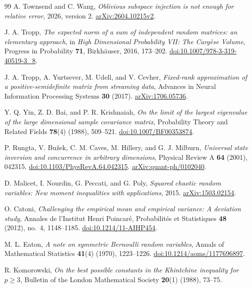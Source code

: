 \documentclass[11pt,a4paper]{article}
\theoremstyle{definition}\newtheorem{definition}[theorem]{Definition}
\theoremstyle{remark}\newtheorem{remark}[theorem]{Remark}
\numberwithin{equation}{section}
\begin{document}
\begin{thebibliography}{99}
A. Townsend and C. Wang,
\emph{Oblivious subspace injection is not enough for relative error},
2026, version 2.
\href{https://arxiv.org/abs/2604.10215v2}{arXiv:2604.10215v2}.

J. A. Tropp,
\emph{The expected norm of a sum of independent random matrices:
an elementary approach}, in \emph{High Dimensional Probability VII:
The Carg\`ese Volume}, Progress in Probability \textbf{71}, Birkh\"auser,
2016, 173--202.
\href{https://doi.org/10.1007/978-3-319-40519-3_8}
{doi:10.1007/978-3-319-40519-3\_8}.

J. A. Tropp, A. Yurtsever, M. Udell, and V. Cevher,
\emph{Fixed-rank approximation of a positive-semidefinite matrix from
streaming data}, Advances in Neural Information Processing Systems
\textbf{30} (2017).
\href{https://arxiv.org/abs/1706.05736}{arXiv:1706.05736}.

Y. Q. Yin, Z. D. Bai, and P. R. Krishnaiah,
\emph{On the limit of the largest eigenvalue of the large dimensional sample covariance matrix},
Probability Theory and Related Fields \textbf{78}(4) (1988), 509--521.
\href{https://doi.org/10.1007/BF00353874}{doi:10.1007/BF00353874}.

P. Rungta, V. Bu\v{z}ek, C. M. Caves, M. Hillery, and G. J. Milburn,
\emph{Universal state inversion and concurrence in arbitrary dimensions},
Physical Review A \textbf{64} (2001), 042315.
\href{https://doi.org/10.1103/PhysRevA.64.042315}
{doi:10.1103/PhysRevA.64.042315}.
\href{https://arxiv.org/abs/quant-ph/0102040}{arXiv:quant-ph/0102040}.

D. Malicet, I. Nourdin, G. Peccati, and G. Poly,
\emph{Squared chaotic random variables: New moment inequalities with
applications}, 2015.
\href{https://arxiv.org/abs/1503.02154}{arXiv:1503.02154}.

O. Catoni,
\emph{Challenging the empirical mean and empirical variance: A deviation study},
Annales de l'Institut Henri Poincar\'e, Probabilit\'es et Statistiques
\textbf{48} (2012), no.~4, 1148--1185.
\href{https://doi.org/10.1214/11-AIHP454}{doi:10.1214/11-AIHP454}.

M. L. Eaton,
\emph{A note on symmetric Bernoulli random variables},
Annals of Mathematical Statistics \textbf{41}(4) (1970), 1223--1226.
\href{https://doi.org/10.1214/aoms/1177696897}{doi:10.1214/aoms/1177696897}.

R. Komorowski,
\emph{On the best possible constants in the Khintchine inequality for $p\ge3$},
Bulletin of the London Mathematical Society \textbf{20}(1) (1988), 73--75.


\end{thebibliography}
\end{document}
